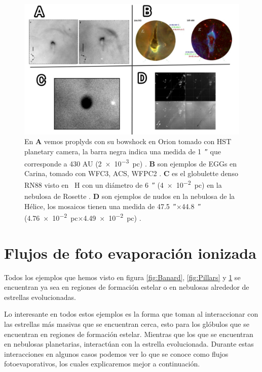 \documentclass{book}
\begin{document}
\begin{figure}[h]
    \centering
    \includegraphics[width=1 \textwidth]{images Chapter 1/C1_Globulettes.jpg}
    \caption{En \textbf{A} vemos proplyds con su bowshock en Orion tomado con HST planetary camera, la barra negra indica una medida de \SI{1}{\arcsecond} que corresponde a 430 AU (\SI{2e-3}{pc}) \citep{Garcia-Arredondo:2001}. \textbf{B} son ejemplos de EGGs en Carina, tomado con WFC3, ACS, WFPC2 \citep{Mesa-Delgado:2016}. \textbf{C} es el globulette denso RN88 visto en \SI{}{H_\alpha} con un diámetro de \SI{6}{\arcsecond} (\SI{4e-2}{pc}) en la nebulosa de Rosette \citep{GFGahm:2013}. \textbf{D} son ejemplos de nudos en la nebulosa de la Hélice, los mosaicos tienen una medida de \SI{47.5}{\arcsecond}$\times$\SI{44.8}{\arcsecond} (\SI{4.76e-2}{pc}$\times$\SI{4.49e-2}{pc}) \citep{O'Dell:2007}. }
    \label{fig:nudos}
\end{figure}



\section{Flujos de foto evaporación ionizada}

Todos los ejemplos  que hemos visto en figura \ref{fig:Banard}, \ref{fig:Pillars} y \ref{fig:nudos} se encuentran ya sea en regiones de formación estelar o en nebulosas alrededor de estrellas evolucionadas. 

Lo interesante en todos estos ejemplos es la forma que toman al interaccionar con las estrellas más masivas que se encuentran cerca, esto para los glóbulos que se encuentran en regiones de formación estelar.  Mientras que los que se encuentran en nebulosas planetarias, interactúan con la estrella evolucionada. Durante estas interacciones en algunos casos podemos ver lo que se conoce como flujos fotoevaporativos, los cuales explicaremos mejor a continuación.
\end{document}
